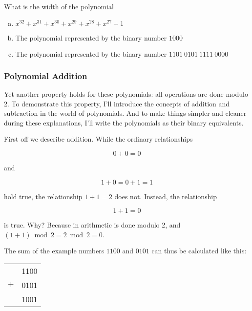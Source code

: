 \begin{Exercise}[label={width-poly}]

  What is the width of the polynomial

  \begin{enumerate}[(a)]
  \item $x^{32} + x^{31} + x^{30} + x^{29} + x^{28} + x^{27} + 1 $
  \item The polynomial represented by the binary number $1000$
  \item The polynomial represented by the binary number $1101\ 0101\
    1111\ 0000$
  \end{enumerate}

\end{Exercise}

\subsubsection{Polynomial Addition}

Yet another property holds for these polynomials: all operations are
done modulo 2. To demonstrate this property, I'll introduce the
concepts of addition and subtraction in the world of \crc
polynomials. And to make things simpler and cleaner during these
explanations, I'll write the polynomials as their binary equivalents.

First off we describe addition. While the ordinary relationships

\begin{equation*}
  0 + 0 = 0
\end{equation*}

and

\begin{equation*}
  1 + 0 = 0 + 1 = 1
\end{equation*}

hold true, the relationship $1 + 1 = 2$
does not. Instead, the relationship

\begin{equation*}
  1 + 1 = 0
\end{equation*}

is true.  Why? Because in \crc arithmetic is done modulo 2, and $(1 +
1) \bmod 2 = 2 \bmod 2 = 0$.

The sum of the example numbers $1100$ and $0101$ can thus be
calculated like this:

\begin{center}
  \begin{tabular}{lr}
    & 1100  \\
    $+$ & 0101 \\
    \hline
    & 1001 \\
  \end{tabular}
\end{center}

